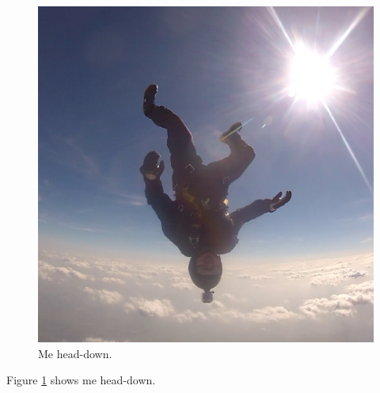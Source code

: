 \documentclass{article}
\begin{document}
\begin{figure}
  \label{fig:headdown}
  \includegraphics[width=\linewidth]{head-down.png}
  \caption{Me head-down.}
\end{figure}

Figure \ref{fig:headdown} shows me head-down.
\end{document}
